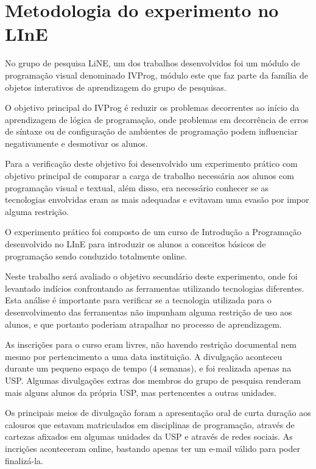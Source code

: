 \section{Metodologia do experimento no LInE}
\label{sec:metodologia_line}

No grupo de pesquisa LiNE, um dos trabalhos desenvolvidos foi um módulo de programação visual denominado IVProg, módulo este que faz parte da família de objetos interativos de aprendizagem do grupo de pesquisas.


O objetivo principal do IVProg é reduzir os problemas decorrentes ao início da aprendizagem de lógica de programação, onde problemas em decorrência de erros de síntaxe ou de configuração de ambientes de programação podem influenciar negativamente e desmotivar os alunos.

Para a verificação deste objetivo foi desenvolvido um experimento prático com objetivo principal de comparar a carga de trabalho necessária aos alunos com programação visual e textual, além disso, era necessário conhecer se as tecnologias envolvidas eram as mais adequadas e evitavam uma evasão por impor alguma restrição. 

O experimento prático foi composto de um curso de Introdução a Programação desenvolvido no LInE para introduzir os alunos a conceitos básicos de programação  sendo conduzido totalmente online.

Neste trabalho será avaliado o objetivo secundário deste experimento, onde foi levantado indícios confrontando as ferramentas utilizando tecnologias diferentes. Esta análise é importante para verificar se a tecnologia utilizada para o desenvolvimento das ferramentas não impunham alguma restrição de uso aos alunos, e que portanto poderiam atrapalhar no processo de aprendizagem.

As inscrições para o curso eram livres, não havendo restrição documental nem mesmo por pertencimento a uma data instituição. A divulgação aconteceu durante um pequeno espaço de tempo (4 semanas), e foi realizada apenas na USP. Algumas divulgações extras dos membros do grupo de pesquisa renderam mais alguns alunos da própria USP, mas pertencentes a outras unidades.

Os principais meios de divulgação foram a apresentação oral de curta duração aos calouros que estavam matriculados em disciplinas de programação, através de cartezas afixados em algumas unidades da USP e através de redes sociais. As incrições aconteceram online, bastando apenas ter um e-mail válido para poder finalizá-la.

